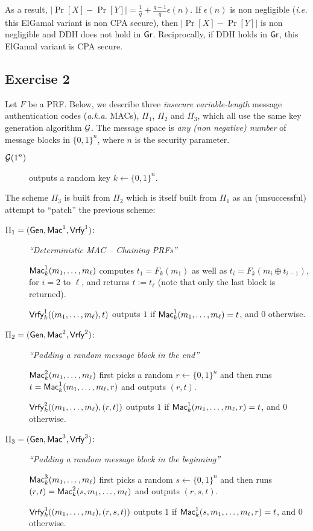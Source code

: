 \begin{solution}
\begin{enumerate}
	As a result,
	$|\Pr[X] - \Pr[Y]| = \frac 1 q + \frac{q-1}{q}\epsilon(n) $. If $\epsilon(n)$ is non negligible (\textit{i.e.} this ElGamal variant is non CPA secure), then $|\Pr[X] - \Pr[Y]|$ is non negligible and DDH does not hold in $\operatorname{\mathsf{Gr}}$. Reciprocally, if DDH holds in $\operatorname{\mathsf{Gr}}$, this ElGamal variant is CPA secure.
\end{enumerate}

\end{solution}

\subsection{Exercise 2}
Let $F$ be a PRF. Below, we describe three \textit{insecure} \emph{variable-length} message authentication codes (\textit{a.k.a.} MACs), $\Pi_1$, $\Pi_2$ and $\Pi_3$, which all use the same key generation algorithm $\mathcal{G}$. The message space is \emph{any (non negative) number} of message blocks in $\{0,1\}^n$, where $n$ is the security parameter. 
%
\begin{description}
	\item[$\mathcal{G}(1^n)$] outputs a random key $k\gets\{0,1\}^n$.
\end{description}
%
The scheme $\Pi_3$ is built from $\Pi_2$ which is itself built from $\Pi_1$ as an (unsuccessful) attempt to ``patch'' the previous scheme:
%
\begin{description}
	\item[$\Pi_1=(\operatorname{\mathsf{Gen}},\operatorname{\mathsf{Mac}}^1,\operatorname{\mathsf{Vrfy}}^1)$:]
	\emph{``Deterministic MAC -- Chaining PRFs''}
	
	$\operatorname{\mathsf{Mac}}^1_k(m_1,\ldots,m_\ell)$ computes $t_1=F_k(m_1)$ as well as
	$t_i=F_k(m_i\oplus t_{i-1})$, for $i=2$ to $\ell$, and returns $t:=t_\ell$ (note that only the last block is returned).
	
	$\operatorname{\mathsf{Vrfy}}^1_k((m_1,\ldots,m_{\ell}),t)$ outputs $1$ if
	$\operatorname{\mathsf{Mac}}^1_k(m_1,\ldots,m_{\ell})=t$, and 0 otherwise.
	\item[$\Pi_2=(\operatorname{\mathsf{Gen}},\operatorname{\mathsf{Mac}}^2,\operatorname{\mathsf{Vrfy}}^2)$:]
	\emph{``Padding a random message block in the end''}
	
	$\operatorname{\mathsf{Mac}}^2_k(m_1,\ldots,m_\ell)$ first picks a random $r\gets\{0,1\}^n$ and
	then runs $t=\operatorname{\mathsf{Mac}}_k^1(m_1,\ldots,m_\ell,r)$ and outputs $(r,t)$.
	
	$\operatorname{\mathsf{Vrfy}}^2_k((m_1,\ldots,m_{\ell}),(r,t))$ outputs $1$ if
	$\operatorname{\mathsf{Mac}}^1_k(m_1,\ldots,m_{\ell},r)=t$, and 0 otherwise.
	
	\item[$\Pi_3=(\operatorname{\mathsf{Gen}},\operatorname{\mathsf{Mac}}^3,\operatorname{\mathsf{Vrfy}}^3)$:]
	\emph{``Padding a random message block in the beginning''}
	
	$\operatorname{\mathsf{Mac}}^3_k(m_1,\ldots,m_\ell)$ first picks a random $s\gets\{0,1\}^n$ and
	then runs $(r,t)=\operatorname{\mathsf{Mac}}_k^2(s,m_1,\ldots,m_\ell)$ and outputs $(r,s,t)$.
	
	$\operatorname{\mathsf{Vrfy}}^3_k((m_1,\ldots,m_{\ell}),(r,s,t))$ outputs $1$ if
	$\operatorname{\mathsf{Mac}}^1_k(s,m_1,\ldots,m_{\ell},r)=t$, and 0 otherwise.
\end{description}

